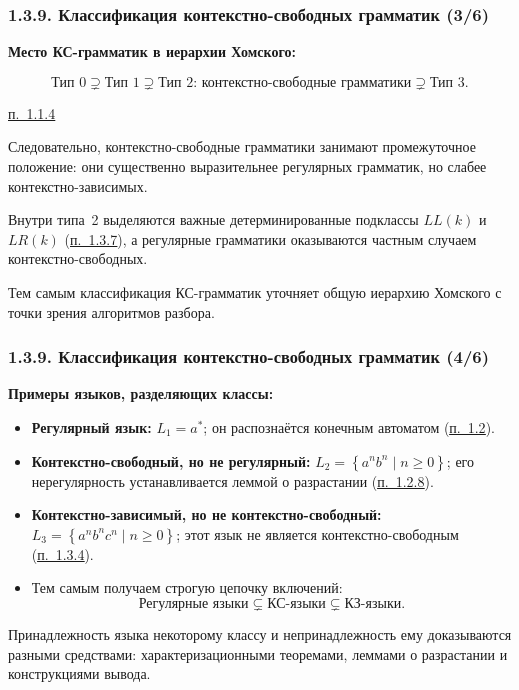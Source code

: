 \documentclass[mathserif,12pt,aspectratio=169]{beamer}
\def\NB#1{{\bf\color{brown}#1}}
\def\Set#1#2{\left\{ #1 \mid #2 \right\}}
\let\ge\geqslant
\def\DMref#1#2{{\color{blue}\underline{\hyperlink{#2}{#1}}}}
\begin{document}
\begin{frame}
\frametitle{1.3.9. Классификация контекстно-свободных грамматик (3/6)}
\NB{Место КС-грамматик в иерархии Хомского:}

\[
\text{Тип 0} \supsetneq \text{Тип 1}
\supsetneq \text{Тип 2: контекстно-свободные грамматики}
\supsetneq \text{Тип 3}.
\]
\centerline{\DMref{п.~1.1.4}{1.1.4.}}

\medskip
Следовательно, контекстно-свободные грамматики занимают
промежуточное положение:
они существенно выразительнее регулярных грамматик,
но слабее контекстно-зависимых.

\medskip
\begin{remark}
Внутри типа~2 выделяются важные детерминированные подклассы
$LL(k)$ и $LR(k)$
(\DMref{п.~1.3.7}{1.3.7.}),
а регулярные грамматики оказываются частным случаем
контекстно-свободных.
\end{remark}

\medskip
\begin{digress}
Тем самым классификация КС-грамматик уточняет
общую иерархию Хомского с точки зрения алгоритмов разбора.
\end{digress}

\end{frame}
\begin{frame}
\frametitle{1.3.9. Классификация контекстно-свободных грамматик (4/6)}

\NB{Примеры языков, разделяющих классы:}

\begin{itemize}
\item \textbf{Регулярный язык:}
$L_1 = a^*$;
он распознаётся конечным автоматом
(\DMref{п.~1.2}{1.2.}).

\item \textbf{Контекстно-свободный, но не регулярный:}
$L_2 = \Set{a^n b^n}{n \ge 0}$;
его нерегулярность устанавливается леммой о разрастании
(\DMref{п.~1.2.8}{1.2.8.}).

\item \textbf{Контекстно-зависимый, но не контекстно-свободный:}
$L_3 = \Set{a^n b^n c^n}{n \ge 0}$;
этот язык не является контекстно-свободным
(\DMref{п.~1.3.4}{1.3.4.}).

\item Тем самым получаем строгую цепочку включений:
\[
\text{Регулярные языки} \subsetneq \text{КС-языки}
\subsetneq \text{КЗ-языки}.
\]
\end{itemize}

\begin{digress}
Принадлежность языка некоторому классу
и непринадлежность ему
доказываются разными средствами:
характеризационными теоремами,
леммами о разрастании и конструкциями вывода.
\end{digress}

\end{frame}
\end{document}
